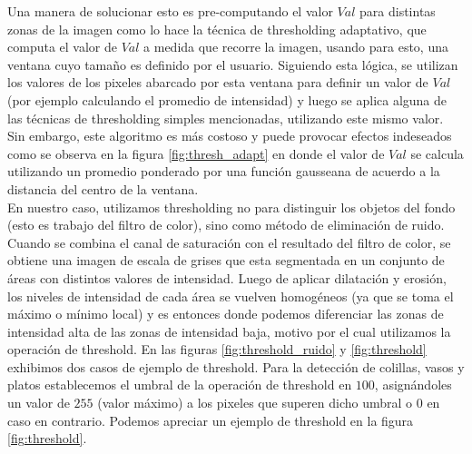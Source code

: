 Una manera de solucionar esto es pre-computando el valor $Val$ para 
distintas zonas de la imagen como lo hace la 
t\'ecnica de thresholding adaptativo, que computa el valor de $Val$ a 
medida que recorre la imagen, usando para esto, una ventana cuyo 
tama\~no es definido por el usuario. Siguiendo esta l\'ogica, se utilizan 
los valores de los pixeles abarcado por esta ventana para definir un valor 
de $Val$ (por ejemplo calculando el promedio de intensidad) y luego se 
aplica alguna de las t\'ecnicas de thresholding simples mencionadas, 
utilizando este mismo valor. Sin embargo, este algoritmo es m\'as 
costoso y puede provocar efectos indeseados como se observa en la 
figura \ref{fig:thresh_adapt} en donde el valor de $Val$ se calcula 
utilizando un promedio ponderado por una funci\'on gausseana de acuerdo a la distancia del centro 
de la ventana.\\
\indent En nuestro caso, utilizamos thresholding no para distinguir los 
objetos del fondo (esto es trabajo del filtro de color), sino como 
m\'etodo de eliminaci\'on de ruido. Cuando se combina el canal de 
saturaci\'on con el resultado del filtro de color, se obtiene una imagen 
de escala de grises que esta segmentada en un conjunto de \'areas con 
distintos valores de intensidad. Luego de aplicar dilataci\'on y 
erosi\'on, los niveles de intensidad de cada \'area se vuelven 
homog\'eneos (ya que se toma el m\'aximo o m\'inimo local) y es entonces 
donde podemos diferenciar las zonas de intensidad alta de las zonas de 
intensidad baja, motivo por el cual utilizamos la operaci\'on de 
threshold. En las figuras \ref{fig:threshold_ruido} y 
\ref{fig:threshold} exhibimos dos casos de ejemplo de threshold. 
Para la detecci\'on de colillas, vasos y platos establecemos 
el umbral de la operaci\'on de threshold en $100$, asign\'andoles un valor 
de $255$ (valor m\'aximo) a los pixeles que superen dicho umbral o $0$ en 
caso en contrario. Podemos apreciar un ejemplo de threshold en la 
figura \ref{fig:threshold}.

